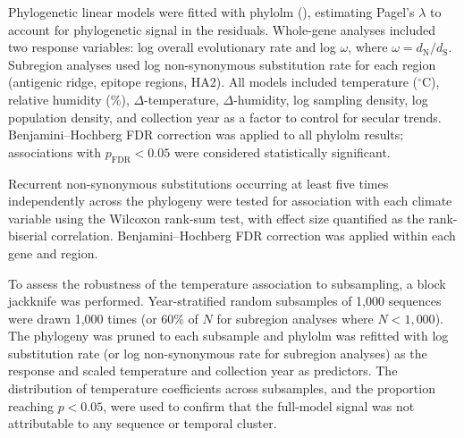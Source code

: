 \documentclass{pnas-new}
\begin{document}
Phylogenetic linear models were fitted with phylolm (\cite{ho_phylolm_2020}), estimating Pagel's $\lambda$ to account for phylogenetic signal in the residuals. Whole-gene analyses included two response variables: log overall evolutionary rate and log $\omega$, where $\omega = d_\text{N} / d_\text{S}$. Subregion analyses used log non-synonymous substitution rate for each region (antigenic ridge, epitope regions, HA2). All models included temperature ($^\circ$C), relative humidity (\%), $\Delta$-temperature, $\Delta$-humidity, log sampling density, log population density, and collection year as a factor to control for secular trends. Benjamini--Hochberg FDR correction was applied to all phylolm results; associations with $p_\text{FDR} < 0.05$ were considered statistically significant.

Recurrent non-synonymous substitutions occurring at least five times independently across the phylogeny were tested for association with each climate variable using the Wilcoxon rank-sum test, with effect size quantified as the rank-biserial correlation. Benjamini--Hochberg FDR correction was applied within each gene and region.

To assess the robustness of the temperature association to subsampling, a block jackknife was performed. Year-stratified random subsamples of 1,000 sequences were drawn 1,000 times (or 60\% of $N$ for subregion analyses where $N < 1{,}000$). The phylogeny was pruned to each subsample and phylolm was refitted with log substitution rate (or log non-synonymous rate for subregion analyses) as the response and scaled temperature and collection year as predictors. The distribution of temperature coefficients across subsamples, and the proportion reaching $p < 0.05$, were used to confirm that the full-model signal was not attributable to any sequence or temporal cluster.


\showmatmethods
\showacknow



\end{document}
